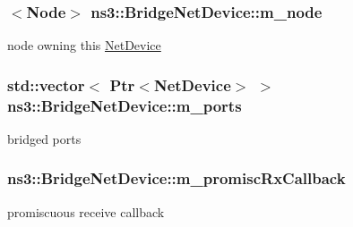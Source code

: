\subsubsection[{\texorpdfstring{m\+\_\+node}{m_node}}]{$<${\bf Node}$>$ ns3\+::\+Bridge\+Net\+Device\+::m\+\_\+node\hspace{0.3cm}{\ttfamily [private]}}\hypertarget{classns3_1_1BridgeNetDevice_a1880454d764d3c555c2fa71a9d66345e}{}\label{classns3_1_1BridgeNetDevice_a1880454d764d3c555c2fa71a9d66345e}


node owning this \hyperlink{classns3_1_1NetDevice}{Net\+Device} 

\subsubsection[{\texorpdfstring{m\+\_\+ports}{m_ports}}]{\setlength{\rightskip}{0pt plus 5cm}std\+::vector$<$ {\bf Ptr}$<${\bf Net\+Device}$>$ $>$ ns3\+::\+Bridge\+Net\+Device\+::m\+\_\+ports\hspace{0.3cm}{\ttfamily [private]}}\hypertarget{classns3_1_1BridgeNetDevice_accf2a9a81b4be28b155d6b5aeeb185be}{}\label{classns3_1_1BridgeNetDevice_accf2a9a81b4be28b155d6b5aeeb185be}


bridged ports 

\subsubsection[{\texorpdfstring{m\+\_\+promisc\+Rx\+Callback}{m_promiscRxCallback}}]{ ns3\+::\+Bridge\+Net\+Device\+::m\+\_\+promisc\+Rx\+Callback\hspace{0.3cm}{\ttfamily [private]}}\hypertarget{classns3_1_1BridgeNetDevice_ae930168508bfb61f8a7721e7a6312654}{}\label{classns3_1_1BridgeNetDevice_ae930168508bfb61f8a7721e7a6312654}


promiscuous receive callback 

